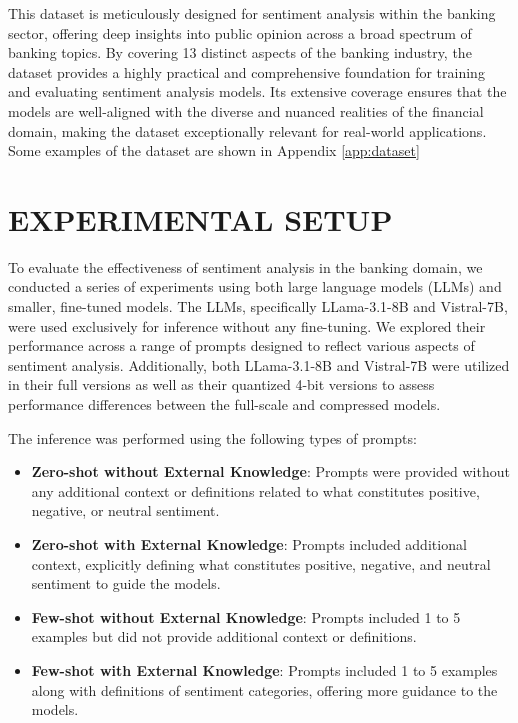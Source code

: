 {This dataset is meticulously designed for sentiment analysis within the banking sector, offering deep insights into public opinion across a broad spectrum of banking topics. By covering 13 distinct aspects of the banking industry, the dataset provides a highly practical and comprehensive foundation for training and evaluating sentiment analysis models. Its extensive coverage ensures that the models are well-aligned with the diverse and nuanced realities of the financial domain, making the dataset exceptionally relevant for real-world applications. Some examples of the dataset are shown in Appendix \ref{app:dataset}

\section{EXPERIMENTAL SETUP}
To evaluate the effectiveness of sentiment analysis in the banking domain, we conducted a series of experiments using both large language models (LLMs) and smaller, fine-tuned models. The LLMs, specifically LLama-3.1-8B and Vistral-7B, were used exclusively for inference without any fine-tuning. We explored their performance across a range of prompts designed to reflect various aspects of sentiment analysis. Additionally, both LLama-3.1-8B and Vistral-7B were utilized in their full versions as well as their quantized 4-bit versions to assess performance differences between the full-scale and compressed models.

The inference was performed using the following types of prompts:
\begin{itemize}
  \item\textbf{Zero-shot without External Knowledge}: Prompts were provided without any additional context or definitions related to what constitutes positive, negative, or neutral sentiment.
  \item\textbf{Zero-shot with External Knowledge}: Prompts included additional context, explicitly defining what constitutes positive, negative, and neutral sentiment to guide the models.
  \item\textbf{Few-shot without External Knowledge}: Prompts included 1 to 5 examples but did not provide additional context or definitions.
  \item\textbf{Few-shot with External Knowledge}: Prompts included 1 to 5 examples along with definitions of sentiment categories, offering more guidance to the models.
\end{itemize}

}
